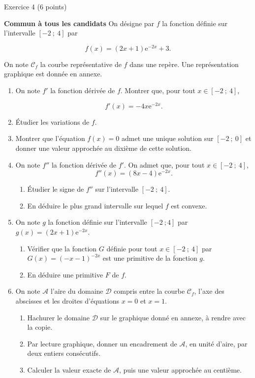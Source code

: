 
\begin{h2}Exercice 4 (6 points)\end{h2}
\textbf{Commun à  tous les candidats}
\medbreak
On désigne par $f$ la fonction définie sur l'intervalle $[-2~;~4]$ par
\par
\[f(x) = (2x+1)\text{e}^{-2x}+3.\]
\par
On note $\mathscr{C}_f$ la courbe représentative de $f$ dans une repère. Une représentation graphique est donnée en annexe.
\begin{enumerate}
     \item On note $f'$ la fonction dérivée de $f$. Montrer que, pour tout $x\in  [-2~;~4]$,
     \par
     \[f'(x)=-4x\text{e}^{-2x}.\]
     \item Étudier les variations de $f$.
     \item Montrer que l'équation $f(x) = 0$ admet une unique solution sur $[-2~;~0]$ et donner une valeur approchée au dixième de cette solution.
     \item On note $f''$ la fonction dérivée de $f'$. On admet que, pour tout $x\in [-2~;~4]$,
      \[f''(x)=(8x-4)\text{e}^{-2x}.\]
     \begin{enumerate}[label=\alph*.]
          \item Étudier le signe de $f''$ sur l'intervalle $[-2~;~4]$.
          \item En déduire le plus grand intervalle sur lequel $f$ est convexe.
     \end{enumerate}
     \item On note $g$ la fonction définie sur l'intervalle $[-2~; 4]$ par $g(x)=(2x+1)\text{e}^{-2x}$.
     \begin{enumerate}[label=\alph*.]
          \item Vérifier que la fonction $G$ définie pour tout $x\in [-2~;~4]$ par $G(x)=(-x-1)^{-2x}$ est une primitive de la fonction $g$.
          \item En déduire une primitive $F$ de $f$.
     \end{enumerate}
     \item On note $\mathscr{A}$ l'aire du domaine $\mathscr{D}$ compris entre la courbe $\mathscr{C}_f$, l'axe des abscisses et les droites d'équations $x=0$ et $x=1$.
     \begin{enumerate}[label=\alph*.]
          \item Hachurer le domaine $\mathscr{D}$ sur le graphique donné en annexe, à rendre avec la copie.
          \item Par lecture graphique, donner un encadrement de $\mathscr{A}$, en unité d'aire, par deux entiers consécutifs.
          \item Calculer la valeur exacte de $\mathscr{A}$, puis une valeur approchée au centième.
     \end{enumerate}
     \end{enumerate}
